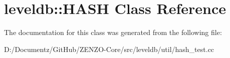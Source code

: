 \hypertarget{classleveldb_1_1_h_a_s_h}{}\section{leveldb\+::H\+A\+SH Class Reference}
\label{classleveldb_1_1_h_a_s_h}


The documentation for this class was generated from the following file\+:\begin{DoxyCompactItemize}
\item 
D\+:/\+Documentz/\+Git\+Hub/\+Z\+E\+N\+Z\+O-\/\+Core/src/leveldb/util/hash\+\_\+test.\+cc\end{DoxyCompactItemize}
